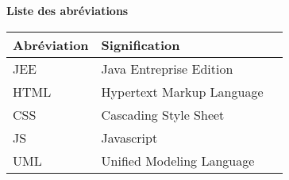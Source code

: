 \begin{center}
\vspace{7cm}    
\textbf{Liste des abréviations }
\vspace{2cm}
\setlength{\arrayrulewidth}{0.5mm}
\setlength{\tabcolsep}{18pt}
\renewcommand{\arraystretch}{2}

\begin{tabular}{ |p{7cm}|p{7cm}|p{7cm}|  }
\hline
\textbf{Abréviation} & \textbf{Signification} \\
\hline
JEE & Java Entreprise Edition \\
HTML & Hypertext Markup Language \\
CSS & Cascading Style Sheet \\
JS & Javascript  \\
UML & Unified Modeling Language\\
\hline
\end{tabular}



\end{center}